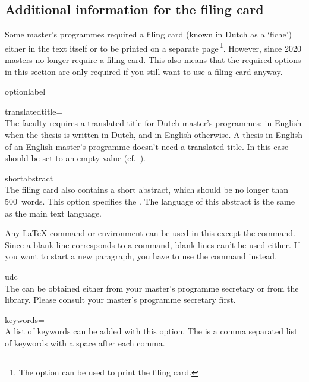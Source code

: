 \subsection{Additional information for the filing card}
Some master's programmes required a filing card (known in Dutch as a
`\foreignlanguage{dutch}{fiche}') either in the text itself or to be printed on
a separate page\,\footnote{The option  can be used to print
the filing card.}. However, since 2020 masters no longer require a filing card.
This also means that the required options in this section are only required if
you still want to use a filing card anyway.
\begin{labelled}{optionlabel}
\item[translatedtitle=\meta{title2\,}]
  \\
  The faculty requires a translated title  for Dutch master's
  programmes: in English when the thesis is written in Dutch, and in English
  otherwise. A thesis in English of an English master's programme doesn't need
  a translated title. In this case  should be set to an empty
  value (cf.\ ).

\item[shortabstract=\meta{short abstract}]
  \\
  The filing card also contains a short abstract, which should be no longer
  than 500~words. This option specifies the . The
  language of this abstract is the same as the main text language.

  Any LaTeX command or environment can be used in this  except the  command. Since a blank line corresponds
  to a  command, blank lines can't be used either. If you want to
  start a new paragraph, you have to use the  command instead.

\item[udc=\meta{UDC nr}]\\
  The can be obtained either from your master's programme
  secretary or from the library. Please consult your master's programme
  secretary first.

\item[keywords=\meta{keywordlist}]\\
  A list of keywords can be added with this option. The 
  is a comma separated list of keywords with a space after each comma.


\end{labelled}
